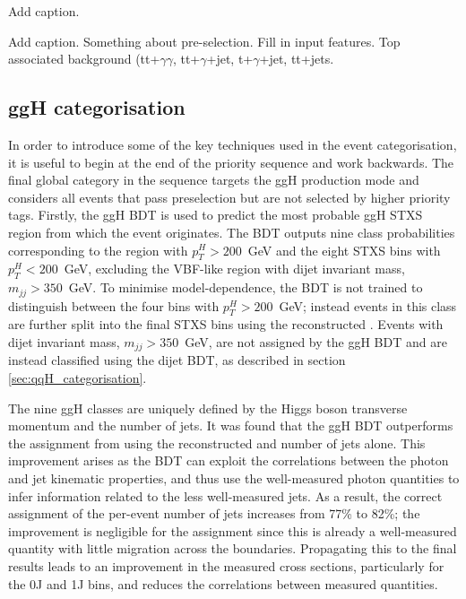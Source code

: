 \begin{table}[htb]
    \caption[Add caption]{Add caption.}
    \label{tab:categorisation_overview}
    \centering
    \tiny
    \renewcommand{\arraystretch}{1.3}
    \setlength{\tabcolsep}{2pt}
    
\end{table}

\begin{landscape}
\thispagestyle{empty}
\begin{table}[htb]
    \caption[Add caption]{Add caption. Something about pre-selection. Fill in input features. Top associated background (tt+$\gamma\gamma$, tt+$\gamma$+jet, t+$\gamma$+jet, tt+jets.}
    \label{tab:categorisation_discriminants}
    \centering
    \scriptsize
    \renewcommand{\arraystretch}{1.5}
    \setlength{\tabcolsep}{3pt}
    
\end{table}
\end{landscape}

\newpage
\subsection{ggH categorisation}
In order to introduce some of the key techniques used in the event categorisation, it is useful to begin at the end of the priority sequence and work backwards. The final global category in the sequence targets the ggH production mode and considers all events that pass preselection but are not selected by higher priority tags. Firstly, the ggH BDT is used to predict the most probable ggH STXS region from which the event originates. The BDT outputs nine class probabilities corresponding to the region with $p_T^H>200$~GeV and the eight STXS bins with $p_T^H<200$~GeV, excluding the VBF-like region with dijet invariant mass, $m_{jj}>350$~GeV. To minimise model-dependence, the BDT is not trained to distinguish between the four bins with $p_T^H>200$~GeV; instead events in this class are further split into the final STXS bins using the reconstructed \ptgg. Events with dijet invariant mass, $m_{jj}>350$~GeV, are not assigned by the ggH BDT and are instead classified using the dijet BDT, as described in section \ref{sec:qqH_categorisation}.

The nine ggH classes are uniquely defined by the Higgs boson transverse momentum and the number of jets. It was found that the ggH BDT outperforms the assignment from using the reconstructed \ptgg and number of jets alone. This improvement arises as the BDT can exploit the correlations between the photon and jet kinematic properties, and thus use the well-measured photon quantities to infer information related to the less well-measured jets. As a result, the correct assignment of the per-event number of jets increases from 77\% to 82\%; the improvement is negligible for the \ptgg assignment since this is already a well-measured quantity with little migration across the \ptH boundaries. Propagating this to the final results leads to an improvement in the measured cross sections, particularly for the 0J and 1J bins, and reduces the correlations between measured quantities.


